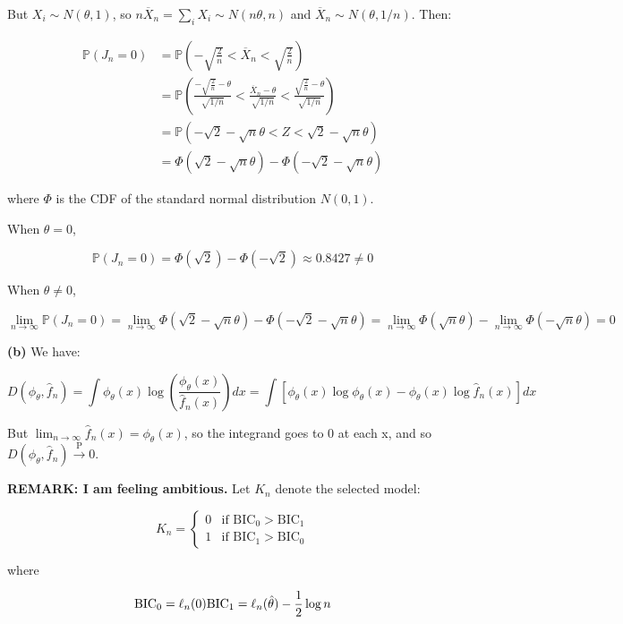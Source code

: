But \(X_i \sim N(\theta, 1)\), so
\(n \overline{X}_n = \sum_i X_i \sim N(n\theta, n)\) and
\(\overline{X}_n \sim N(\theta, 1/n)\). Then:

\begin{align}
\mathbb{P}(J_n = 0) &= \mathbb{P}\left(-\sqrt{\frac{2}{n}} < \overline{X}_n < \sqrt{\frac{2}{n}} \right) \\
&= \mathbb{P}\left(\frac{-\sqrt{\frac{2}{n}} - \theta}{\sqrt{1/n}} < \frac{\overline{X}_n - \theta}{\sqrt{1/n}} < \frac{\sqrt{\frac{2}{n}} - \theta}{\sqrt{1/n}} \right) \\
&= \mathbb{P}\left(-\sqrt{2} - \sqrt{n}\theta < Z < \sqrt{2} - \sqrt{n}\theta \right) \\
&= \Phi(\sqrt{2} - \sqrt{n}\theta) - \Phi(-\sqrt{2} - \sqrt{n}\theta)
\end{align}

where \(\Phi\) is the CDF of the standard normal distribution
\(N(0, 1)\).

When \(\theta = 0\),

\[\mathbb{P}(J_n = 0) = \Phi(\sqrt{2}) - \Phi(-\sqrt{2}) \approx 0.8427 \neq 0\]

When \(\theta \neq 0\),

\[\lim_{n \rightarrow \infty} \mathbb{P}(J_n = 0) = \lim_{n \rightarrow \infty}\Phi(\sqrt{2} - \sqrt{n}\theta) - \Phi(-\sqrt{2} - \sqrt{n}\theta) = \lim_{n \rightarrow \infty}\Phi(\sqrt{n}\theta) - \lim_{n \rightarrow \infty}\Phi(-\sqrt{n}\theta) = 0\]

\textbf{(b)} We have:

\[ D(\phi_\theta, \hat{f}_n) = \int \phi_\theta(x) \log \left(\frac{\phi_\theta(x)}{\hat{f}_n(x)} \right) dx = \int \left[\phi_\theta(x) \log \phi_\theta(x) - \phi_\theta(x) \log \hat{f}_n(x) \right] dx \]

But \(\lim_{n \rightarrow \infty} \hat{f}_n(x) = \phi_\theta(x)\), so
the integrand goes to 0 at each x, and so
\(D(\phi_\theta, \hat{f}_n) \xrightarrow{\text{P}} 0\).

\textbf{REMARK: I am feeling ambitious.} Let \(K_n\) denote the selected
model:

\[ K_n = \begin{cases}
0 & \text{if } \text{BIC}_0 > \text{BIC}_1 \\
1 & \text{if } \text{BIC}_1 > \text{BIC}_0
\end{cases}\]

where

\[
\text{BIC}_0 = \ell_n(0) \\
\text{BIC}_1 = \ell_n(\hat{\theta}) - \frac{1}{2} \log n
\]

